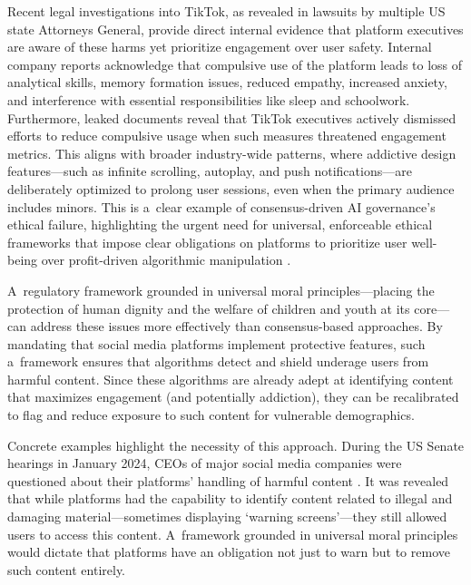 \documentclass[%
  manuscript=article,
  year=2024,
  volume=77,
  doi=00000.000,
]{zfn}
\begin{document}
Recent legal investigations into TikTok, as revealed in lawsuits by multiple US state Attorneys General, provide direct internal evidence that platform executives are aware of these harms yet prioritize engagement over user safety. Internal company reports acknowledge that compulsive use of the platform leads to loss of analytical skills, memory formation issues, reduced empathy, increased anxiety, and interference with essential responsibilities like sleep and schoolwork. Furthermore, leaked documents reveal that TikTok executives actively dismissed efforts to reduce compulsive usage when such measures threatened engagement metrics. This aligns with broader industry-wide patterns, where addictive design features---such as infinite scrolling, autoplay, and push notifications---are deliberately optimized to prolong user sessions, even when the primary audience includes minors. This is a~clear example of consensus-driven AI governance's ethical failure, highlighting the urgent need for universal, enforceable ethical frameworks that impose clear obligations on platforms to prioritize user well-being over profit-driven algorithmic manipulation 
\parencite[][]{haidt_tiktok_2025}.%




A~regulatory framework grounded in universal moral principles---placing the protection of human dignity and the welfare of children and youth at its core---can address these issues more effectively than consensus-based approaches. By mandating that social media platforms implement protective features, such a~framework ensures that algorithms detect and shield underage users from harmful content. Since these algorithms are already adept at identifying content that maximizes engagement (and potentially addiction), they can be recalibrated to flag and reduce exposure to such content for vulnerable demographics.



Concrete examples highlight the necessity of this approach. During the US Senate hearings in January 2024, CEOs of major social media companies were questioned about their platforms' handling of harmful content 
\parencite[][]{ortutay_meta_2024}. %
 It was revealed that while platforms had the capability to identify content related to illegal and damaging material---sometimes displaying `warning screens'---they still allowed users to access this content. A~framework grounded in universal moral principles would dictate that platforms have an obligation not just to warn but to remove such content entirely.
\end{document}

